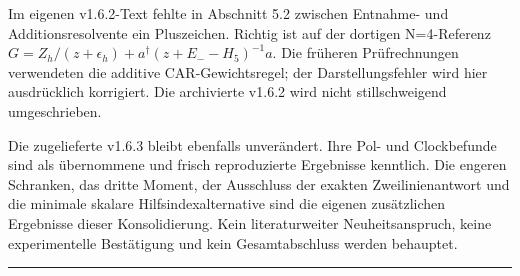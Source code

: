 Im eigenen v1.6.2-Text fehlte in Abschnitt 5.2 zwischen Entnahme- und
Additionsresolvente ein Pluszeichen. Richtig ist auf der dortigen
N=4-Referenz \(G=Z_h/(z+\epsilon_h)+a^\dagger(z+E_--H_5)^{-1}a\). Die
früheren Prüfrechnungen verwendeten die additive CAR-Gewichtsregel; der
Darstellungsfehler wird hier ausdrücklich korrigiert. Die archivierte
v1.6.2 wird nicht stillschweigend umgeschrieben.

Die zugelieferte v1.6.3 bleibt ebenfalls unverändert. Ihre Pol- und
Clockbefunde sind als übernommene und frisch reproduzierte Ergebnisse
kenntlich. Die engeren Schranken, das dritte Moment, der Ausschluss der
exakten Zweilinienantwort und die minimale skalare Hilfsindexalternative
sind die eigenen zusätzlichen Ergebnisse dieser Konsolidierung. Kein
literaturweiter Neuheitsanspruch, keine experimentelle Bestätigung und
kein Gesamtabschluss werden behauptet.

\begin{center}\rule{0.5\linewidth}{0.5pt}\end{center}


